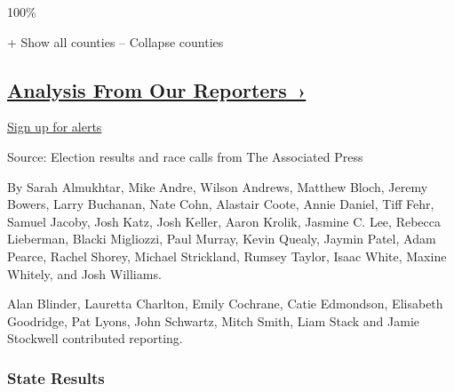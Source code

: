 100\%

+ Show all counties -- Collapse counties

\hypertarget{analysis-from-our-reporters-}{%
\subsection{\texorpdfstring{\href{https://www.nytimes.com/interactive/2018/11/06/us/elections/live-midterm-election-analysis-updates.html}{Analysis
From Our
Reporters~›}}{Analysis From Our Reporters~›}}\label{analysis-from-our-reporters-}}

\protect\hyperlink{}{Sign up for alerts}

Source: Election results and race calls from The Associated Press

By Sarah Almukhtar, Mike Andre, Wilson Andrews, Matthew Bloch, Jeremy
Bowers, Larry Buchanan, Nate Cohn, Alastair Coote, Annie Daniel, Tiff
Fehr, Samuel Jacoby, Josh Katz, Josh Keller, Aaron Krolik, Jasmine C.
Lee, Rebecca Lieberman, Blacki Migliozzi, Paul Murray, Kevin Quealy,
Jaymin Patel, Adam Pearce, Rachel Shorey, Michael Strickland, Rumsey
Taylor, Isaac White, Maxine Whitely, and Josh Williams.

Alan Blinder, Lauretta Charlton, Emily Cochrane, Catie Edmondson,
Elisabeth Goodridge, Pat Lyons, John Schwartz, Mitch Smith, Liam Stack
and Jamie Stockwell contributed reporting.

\hypertarget{state-results}{%
\subsubsection{State Results}\label{state-results}}

